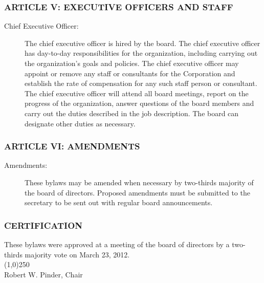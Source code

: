 \documentclass[12pt]{article}
\begin{document}
\subsubsection*{ARTICLE V: EXECUTIVE OFFICERS AND STAFF}
\begin{description}
\item[Chief Executive Officer:] The chief executive officer is hired
by the board.  The chief executive officer has day-to-day
responsibilities for the organization, including carrying out the
organization's goals and policies. The chief executive officer may
appoint or remove any staff or consultants for the Corporation and
establish the rate of compensation for any such staff person or
consultant. The chief executive officer will attend all board
meetings, report on the progress of the organization, answer questions
of the board members and carry out the duties described in the job
description. The board can designate other duties as necessary.
\end{description}

\subsubsection*{ARTICLE VI: AMENDMENTS}
\begin{description}
\item[Amendments:] These bylaws may be amended when necessary by
two-thirds majority of the board of directors. Proposed amendments
must be submitted to the secretary to be sent out with regular board
announcements.
\end{description}

\subsubsection*{CERTIFICATION}

These bylaws were approved at a meeting of the board of directors by a
two-thirds majority vote on March 23, 2012.\\

\vspace{1cm}
\noindent
\line(1,0){250}\\
Robert W. Pinder, Chair
\end{document}
